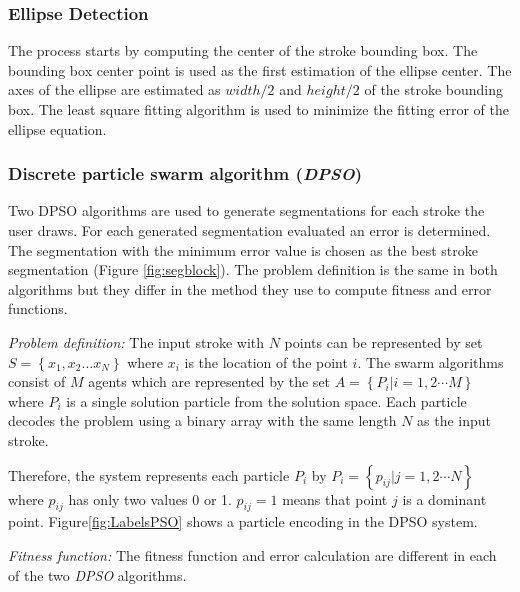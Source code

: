 \documentclass{article}
\begin{document}
\subsubsection{Ellipse Detection} 
The process starts by computing the center of the stroke bounding box. The bounding box center point is used as the first estimation of the ellipse center. The axes of the ellipse are estimated as $width/2$ and $height/2$ of the stroke bounding box. The least square fitting algorithm is used to minimize the fitting error of the ellipse equation.  
\subsubsection{Discrete particle swarm algorithm (\textit{DPSO})}
\label{subsubsec:Discreteparticleswarmalgorithm}
Two DPSO algorithms are used to generate segmentations for each stroke the user draws. For each generated segmentation evaluated an error is determined. The segmentation with the minimum error value is chosen as the best stroke segmentation (Figure \ref{fig:segblock}). The problem definition is the same in both algorithms but they differ in the method they use to compute fitness and error functions. 

\textsl{Problem definition:} The input stroke with $N$ points can be represented by set $S = \left\{ {x_1 ,x_2  \ldots x_N }\right\}$ where $x_i$ is the location of the point $i$. The swarm algorithms consist of $M$ agents which are represented by the set  $A = \left\{ {P_i \left| {i = 1,2 \cdots M} \right.} \right\}$ where $P_i$ is a single solution particle from the solution space. Each particle decodes the problem using a binary array with the same length $N$ as the input stroke.  

Therefore, the system represents each particle $P_i$ by $P_i = \left\{ {p_{ij} \left| {j = 1,2 \cdots N} \right.} \right\}$ where $p_{ij}$ has only two values 0 or 1. $p_{ij}=1$ means that point $j$ is a dominant point. Figure\ref{fig:LabelsPSO} shows a particle encoding in the DPSO system. 

\textsl{Fitness function:} The fitness function and error calculation are different in each of the two \textit{DPSO} algorithms. 
\end{document}

